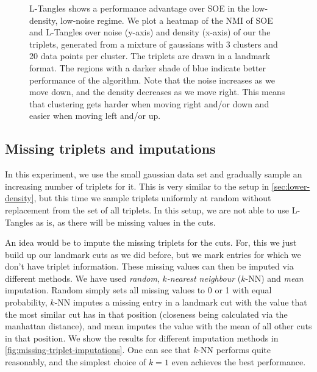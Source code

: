 \onecolumn
\begin{figure}[ht]
    \centering
    \caption{
        L-Tangles shows a performance advantage over SOE in the low-density, low-noise regime. 
        We plot a heatmap of the NMI of SOE and L-Tangles over noise (y-axis) and density (x-axis) of our the triplets, 
        generated from a mixture of gaussians with 3 clusters and 20 data points per cluster. The triplets are drawn in a landmark format. 
        The regions with a darker shade of blue indicate better performance of the algorithm. 
        Note that the noise increases as we move down, and the
        density decreases as we move right. This means that clustering gets harder when moving right and/or down and easier when moving left and/or up.
    }
    \label{fig:noise-density-heatmaps}
\end{figure}

\subsection{Missing triplets and imputations}
In this experiment, we use the small gaussian data set and gradually sample an increasing number of triplets for it. 
This is very similar to the setup in \autoref{sec:lower-density}, but this time we sample triplets uniformly at random without replacement
from the set of all triplets. In this setup, we are not able to use L-Tangles as is, as there will be missing values in the cuts. 

An idea would be to impute the missing triplets for the cuts.  For, this we just build up our landmark cuts as we did before,
but we mark entries for which we don't have triplet information. These missing values can then be imputed via different methods.
We have used \textit{random}, \textit{$k$-nearest neighbour }($k$-NN) and \textit{mean} imputation. Random simply sets all missing values to 0 or 1 with equal probability, $k$-NN imputes
a missing entry in a landmark cut with the value that the most similar cut has in that position (closeness being calculated via the manhattan distance), and mean 
imputes the value with the mean of all other cuts in that position. 
We show the results for different imputation methods in \autoref{fig:missing-triplet-imputations}.  One can see that $k$-NN performs quite reasonably, 
and the simplest choice of $k=1$ even achieves the best performance.

